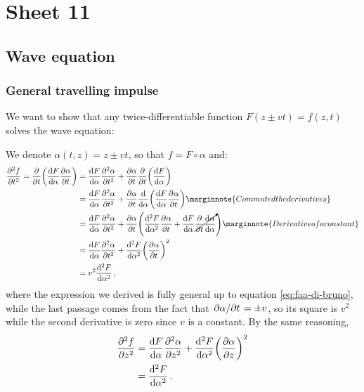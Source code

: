 \documentclass[main.tex]{subfiles}
\begin{document}
\section{Sheet 11}

\subsection{Wave equation}

\subsubsection{General travelling impulse}

We want to show that any twice-differentiable function \(F(z \pm v t) = f(z, t)\) solves the wave equation: 
%

We denote \(\alpha (t,z) = z \pm vt\), so that \(f = F \circ \alpha \) and: 
%
\begin{subequations}
\begin{align}
\pdv[2]{f}{t} = \pdv{}{t }\qty( \dv{F}{\alpha } \pdv{\alpha }{t}) &= \dv{F}{\alpha } \pdv[2]{\alpha }{t} +  \pdv{\alpha }{t} \pdv{}{t} \qty(\dv{F}{\alpha })  \\
&= \dv{F}{\alpha } \pdv[2]{\alpha }{t}
+ \pdv{\alpha }{t}\dv{}{\alpha } \qty(\dv{F}{\alpha } \pdv[]{\alpha }{t}) \marginnote{Commuted the derivatives}\\
&= \dv{F}{\alpha } \pdv[2]{\alpha }{t}
+ \pdv{\alpha }{t} \qty( \dv[2]{F}{\alpha } \pdv[]{\alpha }{t} 
+ \dv{F}{\alpha } \cancelto{}{\pdv{}{t} \dv{\alpha }{\alpha }}) \marginnote{Derivative of a constant}  \\
&= \dv{F}{\alpha } \pdv[2]{\alpha }{t}
+ \dv[2]{F}{\alpha } \qty(\pdv[]{\alpha }{t})^2  \label{eq:faa-di-bruno}\\
&= v^2 \dv[2]{F}{\alpha }
\,,
\end{align}
\end{subequations}
%
where the expression we derived is fully general up to equation \eqref{eq:faa-di-bruno}, while the last passage comes from the fact that \(\pdv*{\alpha }{t} = \pm v\), so its square is \(v^2\) while the second derivative is zero since \(v\) is a constant. By the same reasoning, 
%
\begin{subequations}
\begin{align}
\pdv[2]{f}{z} &= \dv{F}{\alpha } \pdv[2]{\alpha }{z} 
+ \dv[2]{F}{\alpha } \qty(\pdv{\alpha }{z})^2  \\
&= \dv[2]{F}{\alpha }
\,.
\end{align}
\end{subequations}
\end{document}
